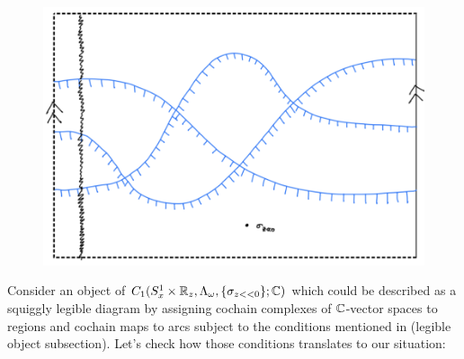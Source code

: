 \begin{figure}[H] 
    \centering
    \includegraphics[scale = 0.55]{diagrams/intro/8.png}
    \caption{}
    \label{fig:your-label}
\end{figure}
Consider an object of $C_1(S^1_x \times \mathbb{R}_z, \Lambda_\omega, \{\sigma_{z<<0}\};\mathbb{C})$ which could be described as a squiggly legible diagram by assigning cochain complexes of $\mathbb{C}$-vector spaces to regions and cochain maps to arcs subject to the conditions mentioned in (legible object subsection). Let's check how those conditions translates to our situation:
